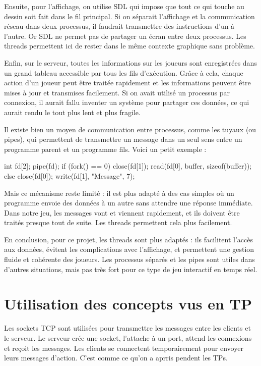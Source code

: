 \documentclass{article}
\begin{document}
Ensuite, pour l'affichage, on utilise SDL qui impose que tout ce qui touche au dessin soit fait dans le fil principal. 
Si on séparait l'affichage et la communication réseau dans deux processus, il faudrait transmettre des instructions d'un à l'autre. 
Or SDL ne permet pas de partager un écran entre deux processus. Les threads permettent ici de rester dans le même contexte graphique sans problème.

Enfin, sur le serveur, toutes les informations sur les joueurs sont enregistrées dans un grand tableau accessible par tous les fils d'exécution. 
Grâce à cela, chaque action d'un joueur peut être traitée rapidement et les informations peuvent être mises à jour et transmises facilement. 
Si on avait utilisé un processus par connexion, il aurait fallu inventer un système pour partager ces données, ce qui aurait rendu le tout plus lent et plus fragile.

Il existe bien un moyen de communication entre processus, comme les tuyaux (ou pipes), 
qui permettent de transmettre un message dans un seul sens entre un programme parent et un programme fils. Voici un petit exemple :

\begin{texC}
int fd[2];
pipe(fd);
if (fork() == 0) {
    close(fd[1]);
    read(fd[0], buffer, sizeof(buffer));
} else {
    close(fd[0]);
    write(fd[1], "Message", 7);
}
\end{texC}

Mais ce mécanisme reste limité : il est plus adapté à des cas simples où un programme envoie des données à un autre sans attendre une réponse immédiate. 
Dans notre jeu, les messages vont et viennent rapidement, et ils doivent être traités presque tout de suite. Les threads permettent cela plus facilement.

En conclusion, pour ce projet, les threads sont plus adaptés : ils facilitent l'accès aux données, évitent les complications avec l'affichage, 
et permettent une gestion fluide et cohérente des joueurs. Les processus séparés et les pipes sont utiles dans d'autres situations, 
mais pas très fort pour ce type de jeu interactif en temps réel.

\section{Utilisation des concepts vus en TP}

Les sockets TCP sont utilisées pour transmettre les messages entre les clients et le serveur. 
Le serveur crée une socket, l'attache à un port, attend les connexions et reçoit les messages. 
Les clients se connectent temporairement pour envoyer leurs messages d'action. 
C'est comme ce qu'on a aprris pendent les TPs.
\end{document}
